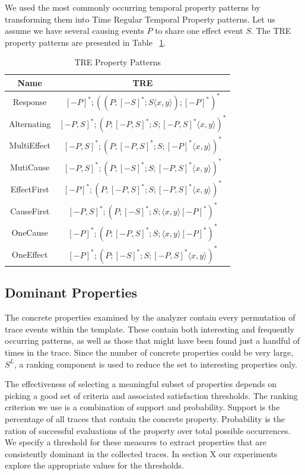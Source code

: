 \documentclass[]{sigplanconf}
\begin{document}
We used the most commonly occurring temporal property patterns \cite{evans} by transforming them into Time Regular Temporal Property patterns. Let us assume we have several causing events $P$ to share one effect event $S$. The TRE property patterns are presented in Table ~\ref{TRE_Exp}.
\begin{table}[ht]
  \centering
  \begin{tabular}{|c|c|}
  \hline
  \textbf{Name} & \textbf{TRE}  \\ \hline
  Response      & $[-P]^*;((P;[-S]^*;S \langle x,y \rangle);[-P]^*)^*$        \\ \hline
  Alternating   & $[-P,S]^*;(P;[-P,S]^*;S;[-P,S]^* \langle x,y \rangle)^*$       \\ \hline
  MultiEffect   &  $[-P,S]^*;(P;[-P,S]^*;S;[-P]^* \langle x,y \rangle)^*$     \\ \hline
  MutiCause     &  $[-P,S]^*;(P;[-S]^*;S;[-P,S]^* \langle x,y \rangle)^*$     \\ \hline
  EffectFirst   &  $[-P]^*;(P;[-P,S]^*;S;[-P,S]^* \langle x,y \rangle)^*$      \\ \hline
  CauseFirst    &  $[-P,S]^*;(P;[-S]^*;S;\langle x,y \rangle [-P]^*)^*$       \\ \hline
  OneCause      &  $[-P]^*;(P;[-P,S]^*;S;\langle x,y \rangle [-P]^*)^*$       \\ \hline
  OneEffect     &  $[-P]^*;(P;[-S]^*;S;[-P,S]^* \langle x,y \rangle)^*$       \\ \hline
\end{tabular}
\caption{TRE Property Patterns}\label{TRE_Exp}
\end{table}

\subsection{Dominant Properties}

The concrete properties examined by the analyzer contain every permutation of trace events within the template. These contain both interesting and frequently occurring patterns, as well as those that might have been found just a handful of times in the trace. Since the number of concrete properties could be very large, $S^L$, a ranking component is used to reduce the set to interesting properties only.

The effectiveness of selecting a meaningful subset of properties depends on picking a good set of criteria and associated satisfaction thresholds. The ranking criterion we use is a combination of support and probability. Support is the percentage of all traces that contain the concrete property. Probability is the ration of successful evaluations of the property over total possible occurrences. We specify a threshold for these measures to extract properties that are consistently dominant in the collected traces. In section X our experiments explore the appropriate values for the thresholds.
\end{document}
